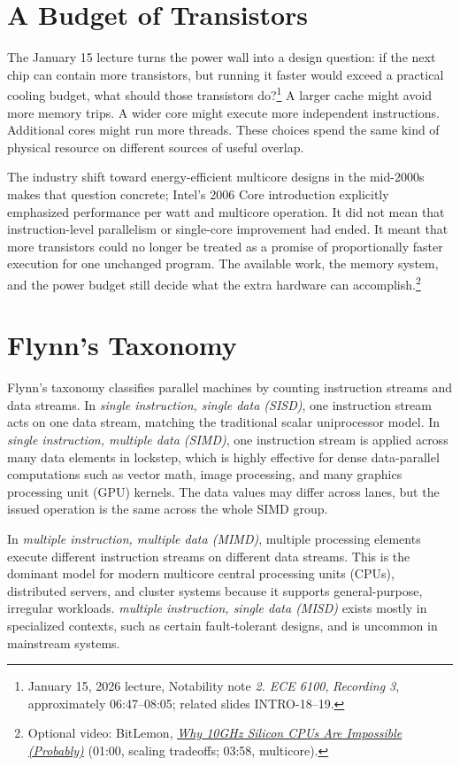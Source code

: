 \section{A Budget of Transistors}\label{sec:transistor-budget}
The January 15 lecture turns the power wall into a design question: if the next chip can contain more transistors, but running it faster would exceed a practical cooling budget, what should those transistors do?\footnote{January 15, 2026 lecture, Notability note \emph{2. ECE 6100}, \emph{Recording 3}, approximately 06:47--08:05; related slides INTRO-18--19.}
A larger cache might avoid more memory trips.
A wider core might execute more independent instructions.
Additional cores might run more threads.
These choices spend the same kind of physical resource on different sources of useful overlap.

The industry shift toward energy-efficient multicore designs in the mid-2000s makes that question concrete; Intel's 2006 Core introduction explicitly emphasized performance per watt and multicore operation.
It did not mean that instruction-level parallelism or single-core improvement had ended.
It meant that more transistors could no longer be treated as a promise of proportionally faster execution for one unchanged program.
The available work, the memory system, and the power budget still decide what the extra hardware can accomplish.\footnote{Optional video: BitLemon, \href{https://youtu.be/5JWcI_xutuI?t=60}{\emph{Why 10GHz Silicon CPUs Are Impossible (Probably)}} (01:00, scaling tradeoffs; 03:58, multicore).}

\section{Flynn's Taxonomy}\label{sec:auto-006}
Flynn's taxonomy classifies parallel machines by counting instruction streams and data streams.
In \textit{single instruction, single data (SISD)}, one instruction stream acts on one data stream, matching the traditional scalar uniprocessor model.
In \textit{single instruction, multiple data (SIMD)}, one instruction stream is applied across many data elements in lockstep, which is highly effective for dense data-parallel computations such as vector math, image processing, and many graphics processing unit (GPU) kernels.
The data values may differ across lanes, but the issued operation is the same across the whole SIMD group.

In \textit{multiple instruction, multiple data (MIMD)}, multiple processing elements execute different instruction streams on different data streams.
This is the dominant model for modern multicore central processing units (CPUs), distributed servers, and cluster systems because it supports general-purpose, irregular workloads.
\textit{multiple instruction, single data (MISD)} exists mostly in specialized contexts, such as certain fault-tolerant designs, and is uncommon in mainstream systems.

